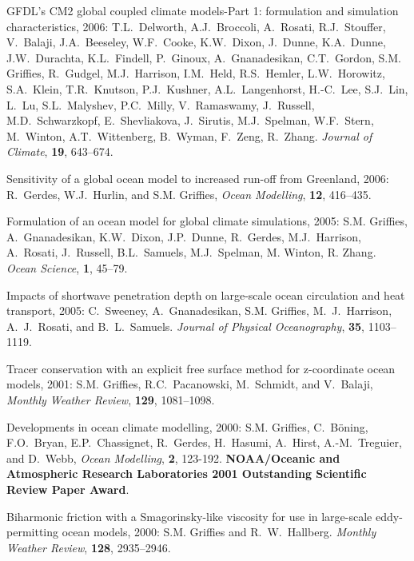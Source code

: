 \begin{etaremune}
\item GFDL's CM2 global coupled climate models-Part 1: formulation and
  simulation characteristics, 2006: T.L.\ Delworth, A.J.\ Broccoli,
  A.\ Rosati, R.J.\ Stouffer, V.\ Balaji, J.A.\ Beeseley, W.F.\ Cooke,
  K.W.\ Dixon, J.\ Dunne, K.A.\ Dunne, J.W.\ Durachta, K.L.\ Findell,
  P.\ Ginoux, A.\ Gnanadesikan, C.T.\ Gordon, 
  S.M. Grif\/f\/ies,
  R.\ Gudgel, M.J.\ Harrison, I.M.\ Held, R.S.\ Hemler, L.W.\
  Horowitz, S.A.\ Klein, T.R.\ Knutson, P.J.\ Kushner, A.L.\
  Langenhorst, H.-C.\ Lee, S.J.\ Lin, L.\ Lu, S.L.\ Malyshev, P.C.\
  Milly, V.\ Ramaswamy, J.\ Russell, M.D.\ Schwarzkopf, E.\
  Shevliakova, J.\ Sirutis, M.J.\ Spelman, W.F.\ Stern, M.\ Winton,
  A.T.\ Wittenberg, B.\ Wyman, F.\ Zeng, R.\ Zhang.  {\em Journal of
    Climate}, {\bf 19}, 643--674.

\item Sensitivity of a global ocean model to increased run-off from
Greenland, 2006: R.\ Gerdes, W.J.\ Hurlin, and 
S.M. Grif\/f\/ies,
{\em Ocean Modelling}, {\bf 12}, 416--435.
  
\item Formulation of an ocean model for global climate simulations,
2005: S.M. Grif\/f\/ies, A.\ Gnanadesikan, K.W.\ Dixon, J.P.\
Dunne, R.\ Gerdes, M.J.\ Harrison, A.\ Rosati, J.\ Russell, B.L.\
Samuels, M.J.\ Spelman, M. Winton, R. Zhang. {\em Ocean Science}, {\bf
1}, 45--79.

\item Impacts of shortwave penetration depth on large-scale ocean
circulation and heat transport, 2005: C.\ Sweeney, A.\ Gnanadesikan,
S.M. Grif\/f\/ies, M.\ J.\ Harrison, A.\ J.\ Rosati, and B.\
L.\ Samuels.  {\em Journal of Physical Oceanography}, {\bf 35},
1103--1119.

\item Tracer conservation with an explicit free surface method for
  z-coordinate ocean models, 2001: 
  S.M. Grif\/f\/ies, R.C.\
  Pacanowski, M.\ Schmidt, and V.\ Balaji, {\em Monthly Weather
    Review}, {\bf 129}, 1081--1098.

\item Developments in ocean climate modelling, 2000:  S.M. Grif\/f\/ies, C.\ B\"oning, F.O.\ Bryan, E.P.\ Chassignet, R.\
  Gerdes, H.\ Hasumi, A.\ Hirst, A.-M.\ Treguier, and D.\ Webb, {\em
    Ocean Modelling}, {\bf 2}, 123-192.  {\bf 
    NOAA/Oceanic and Atmospheric Research Laboratories 2001
    Outstanding Scientific Review Paper Award}.

\item Biharmonic friction with a  Smagorinsky-like viscosity for use in large-scale eddy-permitting ocean models, 2000:
S.M. Grif\/f\/ies and R.\ W.\ Hallberg.  {\em Monthly Weather
Review}, {\bf 128}, 2935--2946.


\end{etaremune}
